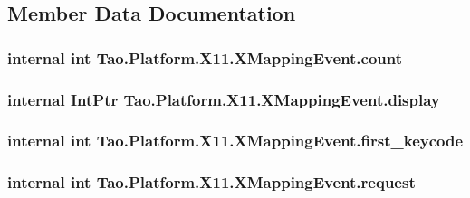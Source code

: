 \subsection{Member Data Documentation}
\hypertarget{struct_tao_1_1_platform_1_1_x11_1_1_x_mapping_event_a10e83424aee6bf9121696063b0171122}{
\subsubsection[{count}]{\setlength{\rightskip}{0pt plus 5cm}internal int {\bf Tao.Platform.X11.XMappingEvent.count}}}
\label{struct_tao_1_1_platform_1_1_x11_1_1_x_mapping_event_a10e83424aee6bf9121696063b0171122}
\hypertarget{struct_tao_1_1_platform_1_1_x11_1_1_x_mapping_event_a39737195cb47dc20ab5506c1efd65a7a}{
\subsubsection[{display}]{\setlength{\rightskip}{0pt plus 5cm}internal IntPtr {\bf Tao.Platform.X11.XMappingEvent.display}}}
\label{struct_tao_1_1_platform_1_1_x11_1_1_x_mapping_event_a39737195cb47dc20ab5506c1efd65a7a}
\hypertarget{struct_tao_1_1_platform_1_1_x11_1_1_x_mapping_event_ac6e16163779f837bc0e2f65c0179d93b}{
\subsubsection[{first\_\-keycode}]{\setlength{\rightskip}{0pt plus 5cm}internal int {\bf Tao.Platform.X11.XMappingEvent.first\_\-keycode}}}
\label{struct_tao_1_1_platform_1_1_x11_1_1_x_mapping_event_ac6e16163779f837bc0e2f65c0179d93b}
\hypertarget{struct_tao_1_1_platform_1_1_x11_1_1_x_mapping_event_a014624007bbaf17cf3985f97497f6c79}{
\subsubsection[{request}]{\setlength{\rightskip}{0pt plus 5cm}internal int {\bf Tao.Platform.X11.XMappingEvent.request}}}
